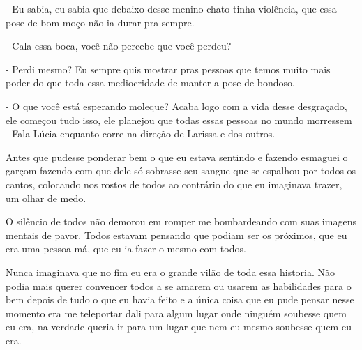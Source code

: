 - Eu sabia, eu sabia que debaixo desse menino chato tinha violência, que essa pose de bom moço não ia durar pra sempre.

- Cala essa boca, você não percebe que você perdeu?

- Perdi mesmo? Eu sempre quis mostrar pras pessoas que temos muito mais poder do que toda essa mediocridade de manter a pose de bondoso.

- O que você está esperando moleque? Acaba logo com a vida desse desgraçado, ele começou tudo isso, ele planejou que todas essas pessoas no mundo morressem - Fala Lúcia enquanto corre na direção de Larissa e dos outros.

Antes que pudesse ponderar bem o que eu estava sentindo e fazendo esmaguei o garçom fazendo com que dele só sobrasse seu sangue que se espalhou por todos os cantos, colocando nos rostos de todos ao contrário do que eu imaginava trazer, um olhar de medo.

O silêncio de todos não demorou em romper me bombardeando com suas imagens mentais de pavor. Todos estavam pensando que podiam ser os próximos, que eu era uma pessoa má, que eu ia fazer o mesmo com todos.

Nunca imaginava que no fim eu era o grande vilão de toda essa historia. Não podia mais querer convencer todos a se amarem ou usarem as habilidades para o bem depois de tudo o que eu havia feito e a única coisa que eu pude pensar nesse momento era me teleportar dali para algum lugar onde ninguém soubesse quem eu era, na verdade queria ir para um lugar que nem eu mesmo soubesse quem eu era.